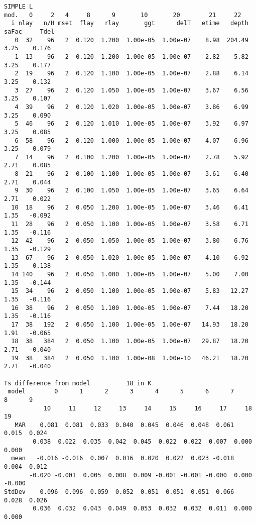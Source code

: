\documentclass{article}
\begin{document}
\begin{table} \caption [KRCSIMPLE run L models]
{Values for the models in SIMPLE run L.  
Columns with numbers correspond to model parameters in Table \ref{sparm}; 
saFac is the stability safety factor for the top layer. Tdel is the surface
temperature at 7 hours (index 14) relative to the average for all models, to
help in curve identification. Lower part: Difference of surface temperature from
model 18 over the 48 output times; MAR= Mean absolute residual } \label{srunL}
\begin{verbatim}
SIMPLE L
mod.   0     2   4     8      9       10       20        21     22 
  i nlay   n/H mset  flay   rlay       ggt      delT   etime   depth  saFac     Tdel
   0  32    96   2  0.120  1.200  1.00e-05  1.00e-07    8.98  204.49   3.25    0.176
   1  13    96   2  0.120  1.200  1.00e-05  1.00e-07    2.82    5.82   3.25    0.177
   2  19    96   2  0.120  1.100  1.00e-05  1.00e-07    2.88    6.14   3.25    0.132
   3  27    96   2  0.120  1.050  1.00e-05  1.00e-07    3.67    6.56   3.25    0.107
   4  39    96   2  0.120  1.020  1.00e-05  1.00e-07    3.86    6.99   3.25    0.090
   5  46    96   2  0.120  1.010  1.00e-05  1.00e-07    3.92    6.97   3.25    0.085
   6  58    96   2  0.120  1.000  1.00e-05  1.00e-07    4.07    6.96   3.25    0.079
   7  14    96   2  0.100  1.200  1.00e-05  1.00e-07    2.78    5.92   2.71    0.085
   8  21    96   2  0.100  1.100  1.00e-05  1.00e-07    3.61    6.40   2.71    0.044
   9  30    96   2  0.100  1.050  1.00e-05  1.00e-07    3.65    6.64   2.71    0.022
  10  18    96   2  0.050  1.200  1.00e-05  1.00e-07    3.46    6.41   1.35   -0.092
  11  28    96   2  0.050  1.100  1.00e-05  1.00e-07    3.58    6.71   1.35   -0.116
  12  42    96   2  0.050  1.050  1.00e-05  1.00e-07    3.80    6.76   1.35   -0.129
  13  67    96   2  0.050  1.020  1.00e-05  1.00e-07    4.10    6.92   1.35   -0.138
  14 140    96   2  0.050  1.000  1.00e-05  1.00e-07    5.00    7.00   1.35   -0.144
  15  34    96   2  0.050  1.100  1.00e-05  1.00e-07    5.83   12.27   1.35   -0.116
  16  38    96   2  0.050  1.100  1.00e-05  1.00e-07    7.44   18.20   1.35   -0.116
  17  38   192   2  0.050  1.100  1.00e-05  1.00e-07   14.93   18.20   1.91   -0.065
  18  38   384   2  0.050  1.100  1.00e-05  1.00e-07   29.87   18.20   2.71   -0.040
  19  38   384   2  0.050  1.100  1.00e-08  1.00e-10   46.21   18.20   2.71   -0.040

Ts difference from model          18 in K
 model        0      1      2      3      4      5      6      7      8      9
           10     11     12     13     14     15     16     17     18     19
   MAR    0.081  0.081  0.033  0.040  0.045  0.046  0.048  0.061  0.015  0.024
        0.038  0.022  0.035  0.042  0.045  0.022  0.022  0.007  0.000  0.000
  mean   -0.016 -0.016  0.007  0.016  0.020  0.022  0.023 -0.018  0.004  0.012
       -0.020 -0.001  0.005  0.008  0.009 -0.001 -0.001 -0.000  0.000 -0.000
StdDev    0.096  0.096  0.059  0.052  0.051  0.051  0.051  0.066  0.028  0.026
        0.036  0.032  0.043  0.049  0.053  0.032  0.032  0.011  0.000  0.000
\end{verbatim}
\vspace{-3.0mm}
\hrulefill \end{table} 
\end{document}
